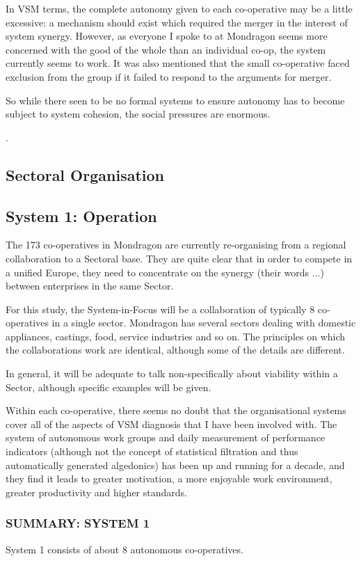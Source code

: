 In VSM terms, the complete autonomy given to each co-operative may be a little excessive: a mechanism should exist which required the merger in the interest of system synergy. However, as everyone I spoke to at Mondragon seems more concerned with the good of the whole than an individual co-op, the system currently seems to work. It was also mentioned that the small co-operative faced exclusion from the group if it failed to respond to the arguments for merger.

So while there seen to be no formal systems to ensure autonomy has to become subject to system cohesion, the social pressures are enormous.

.

\subsection*{Sectoral Organisation}

\subsection*{System 1: Operation}
The 173 co-operatives in Mondragon are currently re-organising from a regional collaboration to a Sectoral base. They are quite clear that in order to compete in a unified Europe, they need to concentrate on the synergy (their words ...) between enterprises in the same Sector.

For this study, the System-in-Focus will be a collaboration of typically 8 co-operatives in a single sector. Mondragon has several sectors dealing with domestic appliances, castings, food, service industries and so on. The principles on which the collaborations work are identical, although some of the details are different.

In general, it will be adequate to talk non-specifically about viability within a Sector, although specific examples will be given.

Within each co-operative, there seems no doubt that the organisational systems cover all of the aspects of VSM diagnosis that I have been involved with. The system of autonomous work groups and daily measurement of performance indicators (although not the concept of statistical filtration and thus automatically generated algedonics) has been up and running for a decade, and they find it leads to greater motivation, a more enjoyable work environment, greater productivity and higher standards.

\subsubsection*{SUMMARY: SYSTEM 1}
System 1 consists of about 8 autonomous co-operatives.

